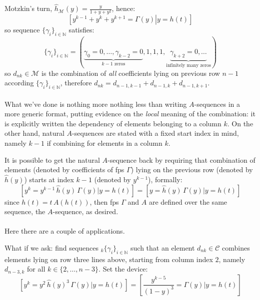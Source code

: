 Motzkin's turn, 
$\hat{h}_{\mathcal{M}}(y) = \frac{y}{1+y+y^2}$, hence:
\begin{displaymath}
        \left.\left[y^{k-1}+y^{k}+y^{k+1}=\Gamma(y)\right| y = h(t) \right]
\end{displaymath}
so sequence $\lbrace \gamma_{i} \rbrace_{i\in\mathbb{N}}$ satisfies:
\begin{displaymath}
    \lbrace \gamma_{i} \rbrace_{i\in\mathbb{N}} = 
        \left(\underbrace{\gamma_{0}=0,\ldots,\gamma_{k-2}=0}_{k-1 \text{ zeros}},
            1,1,1,
            \underbrace{\gamma_{k+2}=0, \ldots}_{\text{infinitely many zeros}} \right)
\end{displaymath}
so $d_{nk}\in\mathcal{M}$ is the combination of \emph{all} coefficients
lying on previous row $n-1$ according $\lbrace \gamma_{i} \rbrace_{i\in\mathbb{N}}$,
therefore $d_{nk}=d_{n-1,k-1}+d_{n-1,k}+d_{n-1,k+1}$.
\\\\
What we've done is nothing more nothing less than writing $A$-sequences 
in a more generic format, putting evidence on the \emph{local} meaning 
of the combination: it is explicitly written the dependency of 
elements belonging to a column $k$. On the other hand, natural $A$-sequences 
are stated with a fixed start index in mind, namely $k-1$ if combining 
for elements in a column $k$.

It is possible to get the natural $A$-sequence back by requiring that 
combination of elements (denoted by coefficients of \ac{fps} $\Gamma$)  
lying on the previous row (denoted by $\hat{h}(y)$)
starts at index $k-1$ (denoted by $y^{k-1}$), formally:
\begin{displaymath}
    \left[y^{k} = y^{k-1}\,\hat{h}(y)\,\Gamma(y) \big| y = h(t) \right] = 
    \left[y = \hat{h}(y)\,\Gamma(y) \big| y = h(t) \right]
\end{displaymath}
since $h(t) = t\,A(h(t))$, then \ac{fps}
$\Gamma$ and $A$ are defined over the same sequence, the $A$-sequence, as desired.
\\\\
Here there are a couple of applications. 

What if we ask: find sequences $_{k}\lbrace \gamma_{i} \rbrace_{i\in\mathbb{N}}$ 
such that an element $d_{nk}\in\mathcal{C}$ combines elements lying on 
row three lines above, starting from column index $2$, 
namely $d_{n-3,k}$ for all $k\in\lbrace 2,\ldots,n-3\rbrace$. 
Set the device:
\begin{displaymath}
    \left[y^{k} = y^{2}\,\hat{h}(y)^3\,\Gamma(y) \big| y = h(t) \right] =
        \left[\frac{y^{k-5}}{(1-y)^3} = \Gamma(y) \big| y = h(t) \right]
\end{displaymath}

